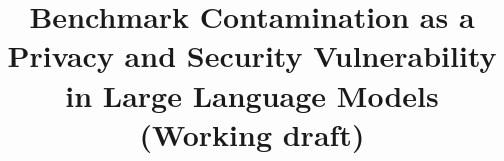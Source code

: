 \documentclass[11pt]{article}
\title{Benchmark Contamination as a Privacy and Security Vulnerability\\in Large Language Models\\[4pt]\large (Working draft)}
\author{}
\date{}
\begin{document}
\maketitle

\begin{abstract}

\end{abstract}













\end{document}
